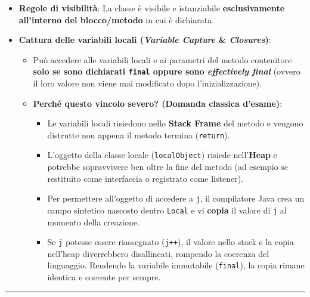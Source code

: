 \documentclass[11pt,a4paper]{article}
\newcommand{\passthrough}[1]{#1}
\providecommand{\tightlist}{\setlength{\itemsep}{0pt}\setlength{\parskip}{0pt}}
\begin{document}
\begin{itemize}
\tightlist
\item
  \textbf{Regole di visibilità}: La classe è visibile e istanziabile
  \textbf{esclusivamente all'interno del blocco/metodo} in cui è
  dichiarata.
\item
  \textbf{Cattura delle variabili locali (\emph{Variable Capture} \&
  \emph{Closures})}:

  \begin{itemize}
  \tightlist
  \item
    Può accedere alle variabili locali e ai parametri del metodo
    contenitore \textbf{solo se sono dichiarati
    \passthrough{\lstinline!final!} oppure sono \emph{effectively
    final}} (ovvero il loro valore non viene mai modificato dopo
    l'inizializzazione).
  \item
    \textbf{Perché questo vincolo severo? (Domanda classica d'esame)}:

    \begin{itemize}
    \tightlist
    \item
      Le variabili locali risiedono nello \textbf{Stack Frame} del
      metodo e vengono distrutte non appena il metodo termina
      (\passthrough{\lstinline!return!}).
    \item
      L'oggetto della classe locale
      (\passthrough{\lstinline!localObject!}) risiede nell'\textbf{Heap}
      e potrebbe sopravvivere ben oltre la fine del metodo (ad esempio
      se restituito come interfaccia o registrato come listener).
    \item
      Per permettere all'oggetto di accedere a
      \passthrough{\lstinline!j!}, il compilatore Java crea un campo
      sintetico nascosto dentro \passthrough{\lstinline!Local!} e vi
      \textbf{copia} il valore di \passthrough{\lstinline!j!} al momento
      della creazione.
    \item
      Se \passthrough{\lstinline!j!} potesse essere riassegnato
      (\passthrough{\lstinline!j++!}), il valore nello stack e la copia
      nell'heap diverrebbero disallineati, rompendo la coerenza del
      linguaggio. Rendendo la variabile immutabile
      (\passthrough{\lstinline!final!}), la copia rimane identica e
      coerente per sempre.
    \end{itemize}
  \end{itemize}
\end{itemize}

\begin{center}\rule{0.5\linewidth}{0.5pt}\end{center}
\end{document}

